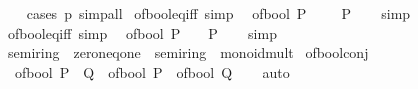 \begin{isabellebody}
%
\isadelimproof
\ \ %
\endisadelimproof
%
\isatagproof
{}\isamarkupfalse%
\ {\isacharparenleft}{\kern0pt}cases\ p{\isacharparenright}{\kern0pt}\ simp{\isacharunderscore}{\kern0pt}all%
\endisatagproof
{\isafoldproof}%
%
\isadelimproof
\isanewline
%
\endisadelimproof
\isanewline
{}\isamarkupfalse%
\ of{\isacharunderscore}{\kern0pt}bool{\isacharunderscore}{\kern0pt}eq{\isacharunderscore}{\kern0pt}{}{\isacharunderscore}{\kern0pt}iff\ {\isacharbrackleft}{\kern0pt}simp{\isacharbrackright}{\kern0pt}{\isacharcolon}{\kern0pt}\isanewline
\ \ {\isacartoucheopen}of{\isacharunderscore}{\kern0pt}bool\ P\ {\isacharequal}{\kern0pt}\ {}\ {\isasymlongleftrightarrow}\ {\isasymnot}\ P{\isacartoucheclose}\isanewline
%
\isadelimproof
\ \ %
\endisadelimproof
%
\isatagproof
{}\isamarkupfalse%
\ simp%
\endisatagproof
{\isafoldproof}%
%
\isadelimproof
\isanewline
%
\endisadelimproof
\isanewline
{}\isamarkupfalse%
\ of{\isacharunderscore}{\kern0pt}bool{\isacharunderscore}{\kern0pt}eq{\isacharunderscore}{\kern0pt}{}{\isacharunderscore}{\kern0pt}iff\ {\isacharbrackleft}{\kern0pt}simp{\isacharbrackright}{\kern0pt}{\isacharcolon}{\kern0pt}\isanewline
\ \ {\isacartoucheopen}of{\isacharunderscore}{\kern0pt}bool\ P\ {\isacharequal}{\kern0pt}\ {}\ {\isasymlongleftrightarrow}\ P{\isacartoucheclose}\isanewline
%
\isadelimproof
\ \ %
\endisadelimproof
%
\isatagproof
{}\isamarkupfalse%
\ simp%
\endisatagproof
{\isafoldproof}%
%
\isadelimproof
\isanewline
%
\endisadelimproof
\isanewline
{}\isamarkupfalse%
\isanewline
\isanewline
{}\isamarkupfalse%
\ semiring{\isacharunderscore}{\kern0pt}{}\ {\isacharequal}{\kern0pt}\ zero{\isacharunderscore}{\kern0pt}neq{\isacharunderscore}{\kern0pt}one\ {\isacharplus}{\kern0pt}\ semiring{\isacharunderscore}{\kern0pt}{}\ {\isacharplus}{\kern0pt}\ monoid{\isacharunderscore}{\kern0pt}mult\isanewline
{}\isanewline
\isanewline
{}\isamarkupfalse%
\ of{\isacharunderscore}{\kern0pt}bool{\isacharunderscore}{\kern0pt}conj{\isacharcolon}{\kern0pt}\isanewline
\ \ {\isachardoublequoteopen}of{\isacharunderscore}{\kern0pt}bool\ {\isacharparenleft}{\kern0pt}P\ {\isasymand}\ Q{\isacharparenright}{\kern0pt}\ {\isacharequal}{\kern0pt}\ of{\isacharunderscore}{\kern0pt}bool\ P\ {\isacharasterisk}{\kern0pt}\ of{\isacharunderscore}{\kern0pt}bool\ Q{\isachardoublequoteclose}\isanewline
%
\isadelimproof
\ \ %
\endisadelimproof
%
\isatagproof
{}\isamarkupfalse%
\ auto%

\end{isabellebody}
